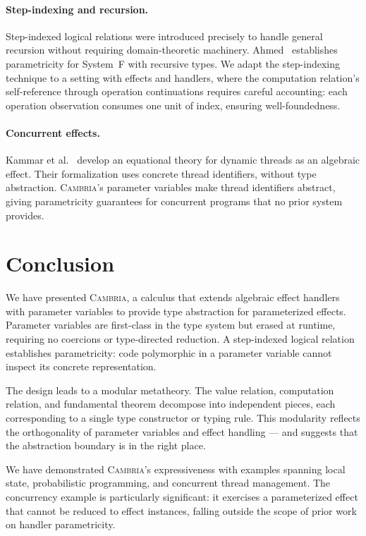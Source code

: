 \documentclass[acmsmall,screen,review,anonymous]{acmart}
\newcommand{\cambria}{\textsc{Cambria}}
\begin{document}
\paragraph{Step-indexing and recursion.}
Step-indexed logical relations were introduced precisely to handle general recursion without requiring domain-theoretic machinery. Ahmed~\cite{ahmed_semantics_2006} establishes parametricity for System~F with recursive types. We adapt the step-indexing technique to a setting with effects and handlers, where the computation relation's self-reference through operation continuations requires careful accounting: each operation observation consumes one unit of index, ensuring well-foundedness.

\paragraph{Concurrent effects.}
Kammar et al.~\cite{kammar2025equational} develop an equational theory for dynamic threads as an algebraic effect. Their formalization uses concrete thread identifiers, without type abstraction. \cambria{}'s parameter variables make thread identifiers abstract, giving parametricity guarantees for concurrent programs that no prior system provides.

\section{Conclusion}\label{sec:conclusion}

We have presented \cambria{}, a calculus that extends algebraic effect handlers with parameter variables to provide type abstraction for parameterized effects. Parameter variables are first-class in the type system but erased at runtime, requiring no coercions or type-directed reduction. A step-indexed logical relation establishes parametricity: code polymorphic in a parameter variable cannot inspect its concrete representation.

The design leads to a modular metatheory. The value relation, computation relation, and fundamental theorem decompose into independent pieces, each corresponding to a single type constructor or typing rule. This modularity reflects the orthogonality of parameter variables and effect handling --- and suggests that the abstraction boundary is in the right place.

We have demonstrated \cambria{}'s expressiveness with examples spanning local state, probabilistic programming, and concurrent thread management. The concurrency example is particularly significant: it exercises a parameterized effect that cannot be reduced to effect instances, falling outside the scope of prior work on handler parametricity.
\end{document}

